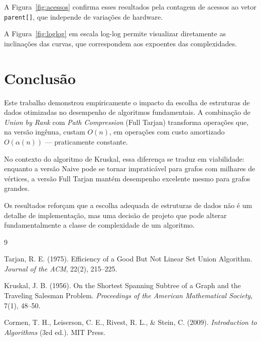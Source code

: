 \documentclass[12pt]{article}
\begin{document}
A Figura~\ref{fig:acessos} confirma esses resultados pela contagem de acessos ao vetor \texttt{parent[]}, que independe de variações de hardware.

A Figura~\ref{fig:loglog} em escala log-log permite visualizar diretamente as inclinações das curvas, que correspondem aos expoentes das complexidades.


\section{Conclusão}

Este trabalho demonstrou empiricamente o impacto da escolha de estruturas de dados otimizadas no desempenho de algoritmos fundamentais. A combinação de \emph{Union by Rank} com \emph{Path Compression} (Full Tarjan) transforma operações que, na versão ingênua, custam $O(n)$, em operações com custo amortizado $O(\alpha(n))$ — praticamente constante.

No contexto do algoritmo de Kruskal, essa diferença se traduz em viabilidade: enquanto a versão Naive pode se tornar impraticável para grafos com milhares de vértices, a versão Full Tarjan mantém desempenho excelente mesmo para grafos grandes.

Os resultados reforçam que a escolha adequada de estruturas de dados não é um detalhe de implementação, mas uma decisão de projeto que pode alterar fundamentalmente a classe de complexidade de um algoritmo.


\begin{thebibliography}{9}

Tarjan, R. E. (1975). Efficiency of a Good But Not Linear Set Union Algorithm. \emph{Journal of the ACM}, 22(2), 215--225.

Kruskal, J. B. (1956). On the Shortest Spanning Subtree of a Graph and the Traveling Salesman Problem. \emph{Proceedings of the American Mathematical Society}, 7(1), 48--50.

Cormen, T. H., Leiserson, C. E., Rivest, R. L., \& Stein, C. (2009). \emph{Introduction to Algorithms} (3rd ed.). MIT Press.

\end{thebibliography}
\end{document}
